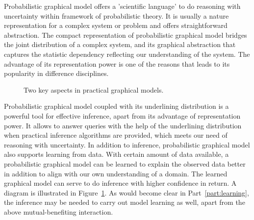 Probabilistic graphical model offers a 'scientific language' to do reasoning with uncertainty within framework of probabilistic theory. It is usually a nature representation for a complex system or problem and offers straightforward abstraction. The compact representation of probabilistic graphical model bridges the joint distribution of a complex system, and its graphical abstraction that captures the statistic dependency reflecting our understanding of the system. The advantage of its representation power is one of the reasons that leads to its popularity in difference disciplines.

\begin{figure}[!t]
  \centering
  \caption{Two key aspects in practical graphical models.}
  \label{fig:intro-pgm}
  \hspace{1cm}
\end{figure}

Probabilistic graphical model coupled with its underlining distribution is a powerful tool for effective inference, apart from its advantage of representation power. It allows to answer queries with the help of the underlining distribution when practical inference algorithms are provided, which meets our need of reasoning with uncertainty. In addition to inference, probabilistic graphical model also supports learning from data. With certain amount of data available, a probabilistic graphical model can be learned to explain the observed data better in addition to align with our own understanding of a domain. The learned graphical model can serve to do inference with higher confidence in return. A diagram is illustrated in Figure~\ref{fig:intro-pgm}. As would become clear in Part~\ref{part:learning}, the inference may be needed to carry out model learning as well, apart from the above mutual-benefiting interaction.



